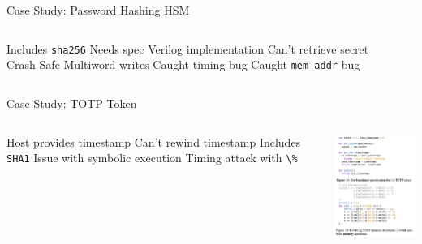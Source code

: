 \begin{frame}{Case Study: Password Hashing HSM}
\begin{columns}
  \begin{outline}
    \1 Includes \lstinline{sha256}
    \2 Needs spec
    \2 Verilog implementation
    \1 Can't retrieve secret
    \1 Crash Safe 
    \2 Multiword writes
    \2 Caught timing bug
    \1 Caught \lstinline{mem_addr} bug
  \end{outline}

  \centering
  \begin{center}
\end{center}
\end{columns}
\end{frame}

\placelogofalse
\begin{frame}{Case Study: TOTP Token}
\begin{columns}
  \begin{outline}
    \1 Host provides timestamp
    \1 Can't rewind timestamp
    \1 Includes \lstinline{SHA1} 
    \1 Issue with symbolic execution
    \2 Timing attack with \lstinline{\%} 
  \end{outline}

  \centering
  \begin{center}
  \includegraphics[width=5cm]{totp_spec.png}
  \end{center}
\end{columns}
\end{frame}
\placelogotrue
